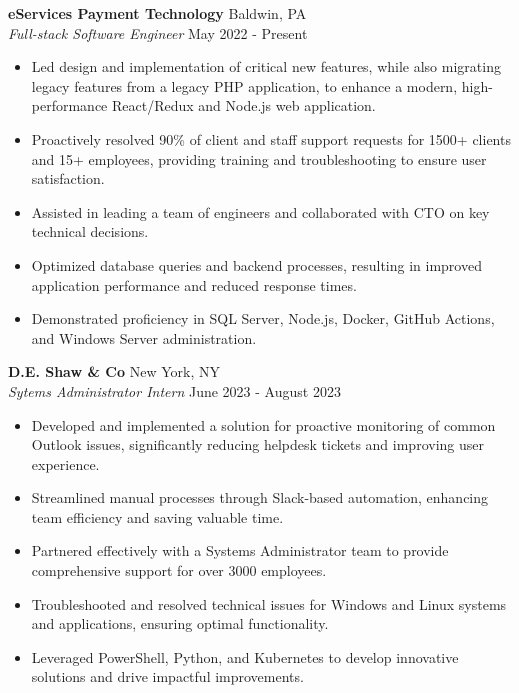 \documentclass[letterpaper]{article}
\begin{document}
\textbf{eServices Payment Technology} \hfill Baldwin, PA\\
\textit{Full-stack Software Engineer} \hfill May 2022 - Present\\
\vspace{-1mm}
\begin{itemize} \itemsep -1pt
    \item Led design and implementation of critical new features, while also migrating legacy features from a legacy PHP application, to enhance a modern, high-performance React/Redux and Node.js web application.
    \item Proactively resolved 90\% of client and staff support requests for 1500+ clients and 15+ employees, providing training and troubleshooting to ensure user satisfaction.
    \item Assisted in leading a team of engineers and collaborated with CTO on key technical decisions.
    \item Optimized database queries and backend processes, resulting in improved application performance and reduced response times.
    \item Demonstrated proficiency in SQL Server, Node.js, Docker, GitHub Actions, and Windows Server administration.
\end{itemize}
\vspace{-1mm}
\textbf{D.E. Shaw \& Co} \hfill New York, NY\\
\textit{Sytems Administrator Intern} \hfill June 2023 - August 2023\\
\vspace{-1mm}
\begin{itemize} \itemsep -1pt
	\item Developed and implemented a solution for proactive monitoring of common Outlook issues, significantly reducing helpdesk tickets and improving user experience.
	\item Streamlined manual processes through Slack-based automation, enhancing team efficiency and saving valuable time.
	\item Partnered effectively with a Systems Administrator team to provide comprehensive support for over 3000 employees.
	\item Troubleshooted and resolved technical issues for Windows and Linux systems and applications, ensuring optimal functionality.
	\item Leveraged PowerShell, Python, and Kubernetes to develop innovative solutions and drive impactful improvements.
\end{itemize}
\end{document}
